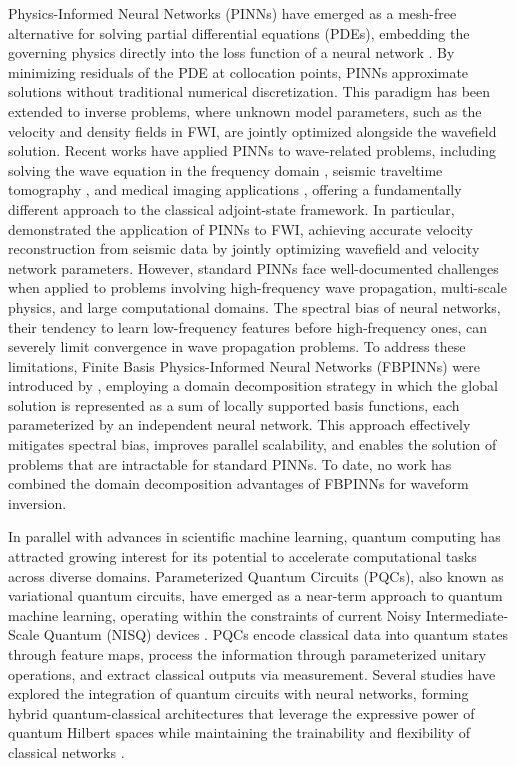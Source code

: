\documentclass[11pt,a4paper]{article}
\begin{document}
Physics-Informed Neural Networks (PINNs) have emerged as a mesh-free alternative for solving partial differential equations (PDEs), embedding the governing physics directly into the loss function of a neural network \citep{RAISSI2019686}. By minimizing residuals of the PDE at collocation points, PINNs approximate solutions without traditional numerical discretization. This paradigm has been extended to inverse problems, where unknown model parameters, such as the velocity and density fields in FWI, are jointly optimized alongside the wavefield solution. Recent works have applied PINNs to wave-related problems, including solving the wave equation in the frequency domain \citep{10.1093/gji/ggab010}, seismic traveltime tomography \citep{waheed2021pinntomoseismictomographyusing}, and medical imaging applications \citep{10230537}, offering a fundamentally different approach to the classical adjoint-state framework. In particular, \citep{rahst} demonstrated the application of PINNs to FWI, achieving accurate velocity reconstruction from seismic data by jointly optimizing wavefield and velocity network parameters. However, standard PINNs face well-documented challenges when applied to problems involving high-frequency wave propagation, multi-scale physics, and large computational domains. The spectral bias of neural networks, their tendency to learn low-frequency features before high-frequency ones, can severely limit convergence in wave propagation problems. To address these limitations, Finite Basis Physics-Informed Neural Networks (FBPINNs) were introduced by \citet{Moseley2023}, employing a domain decomposition strategy in which the global solution is represented as a sum of locally supported basis functions, each parameterized by an independent neural network. This approach effectively mitigates spectral bias, improves parallel scalability, and enables the solution of problems that are intractable for standard PINNs.  To date, no work has combined the domain decomposition advantages of FBPINNs for waveform inversion.

In parallel with advances in scientific machine learning, quantum computing has attracted growing interest for its potential to accelerate computational tasks across diverse domains. Parameterized Quantum Circuits (PQCs), also known as variational quantum circuits, have emerged as a near-term approach to quantum machine learning, operating within the constraints of current Noisy Intermediate-Scale Quantum (NISQ) devices \citep{Preskill2018quantumcomputingin}. PQCs encode classical data into quantum states through feature maps, process the information through parameterized unitary operations, and extract classical outputs via measurement. Several studies have explored the integration of quantum circuits with neural networks, forming hybrid quantum-classical architectures that leverage the expressive power of quantum Hilbert spaces while maintaining the trainability and flexibility of classical networks \citep{PhysRevA.101.032308, Benedetti_2019, Ostaszewski2021structure}.
\end{document}
